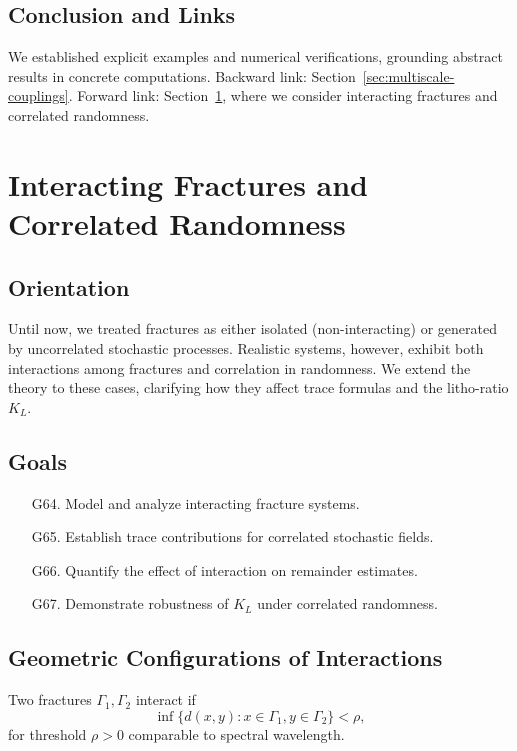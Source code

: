 \subsection*{Conclusion and Links}

We established explicit examples and numerical verifications, grounding abstract results in concrete computations.  
Backward link: Section~\ref{sec:multiscale-couplings}.  
Forward link: Section~\ref{sec:nonlinear-stochastic-interactions}, where we consider interacting fractures and correlated randomness.  

\section{Interacting Fractures and Correlated Randomness}
\label{sec:nonlinear-stochastic-interactions}

\subsection*{Orientation}

Until now, we treated fractures as either isolated (non-interacting) or generated by uncorrelated stochastic processes.  
Realistic systems, however, exhibit both interactions among fractures and correlation in randomness.  
We extend the theory to these cases, clarifying how they affect trace formulas and the litho-ratio $K_L$.  

\subsection*{Goals}

\begin{itemize}
  \item[G64.] Model and analyze interacting fracture systems.  
  \item[G65.] Establish trace contributions for correlated stochastic fields.  
  \item[G66.] Quantify the effect of interaction on remainder estimates.  
  \item[G67.] Demonstrate robustness of $K_L$ under correlated randomness.  
\end{itemize}

\subsection{Geometric Configurations of Interactions}

\begin{definition}
Two fractures $\Gamma_1,\Gamma_2$ interact if 
\[
\inf\{ d(x,y): x\in \Gamma_1, y\in \Gamma_2\} < \rho,
\]
for threshold $\rho>0$ comparable to spectral wavelength.  
\end{definition}

